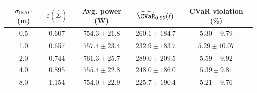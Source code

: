 \begin{tabular}{ccccc}
\toprule
$\sigma_{\rm ISAC}$ (m) & $\bar\varepsilon(\widehat\Sigma)$ & Avg. power (W) & $\widehat{\CVaR}_{0.95}(\ell)$ & CVaR violation (\%) \\
\midrule
0.5 & 0.607 & $754.3\!\pm\!21.8$ & $260.1\!\pm\!184.7$ & $5.30\!\pm\!9.79$ \\
1.0 & 0.657 & $757.4\!\pm\!23.4$ & $232.9\!\pm\!183.7$ & $5.29\!\pm\!10.07$ \\
2.0 & 0.744 & $761.3\!\pm\!25.7$ & $289.0\!\pm\!209.5$ & $5.59\!\pm\!9.92$ \\
4.0 & 0.895 & $755.4\!\pm\!22.8$ & $248.0\!\pm\!186.0$ & $5.39\!\pm\!9.81$ \\
8.0 & 1.154 & $754.0\!\pm\!22.9$ & $225.7\!\pm\!190.4$ & $5.21\!\pm\!9.76$ \\
\bottomrule
\end{tabular}
